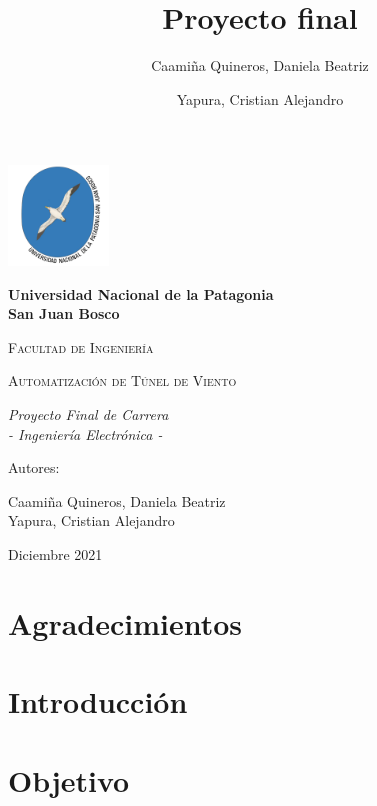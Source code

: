 \documentclass[12pt,a4paper]{article}
\author{Caamiña Quineros, Daniela Beatriz\\ \and Yapura, Cristian Alejandro}
\title{Proyecto final}
\begin{document}

\begin{titlepage}
	\centering
	{\includegraphics[width=0.2\textwidth]{unpsjb.png}\par}
	\vspace{1cm}
	{\bfseries\LARGE Universidad Nacional de la Patagonia\\ San Juan Bosco \par}
	\vspace{1cm}
	{\scshape\Large Facultad de Ingenier\'ia \par}
	\vspace{3cm}
	{\scshape\Huge Automatización de Túnel de Viento \par}
	\vspace{3cm}
	{\itshape\Large Proyecto Final de Carrera\\ - Ingeniería Electrónica - \par}
	\vfill
	{\Large Autores: \par}
	{\Large Caamiña Quineros, Daniela Beatriz\\ Yapura, Cristian Alejandro \par}
	\vfill
	{\Large Diciembre 2021 \par}
	\end{titlepage}



\newpage


\section*{Agradecimientos}

\newpage

	\tableofcontents
	\newpage
	\listoffigures
	\newpage
	\listoftables
	\newpage


	\section{Introducción}
	


	\section{Objetivo}
	
\end{document}

